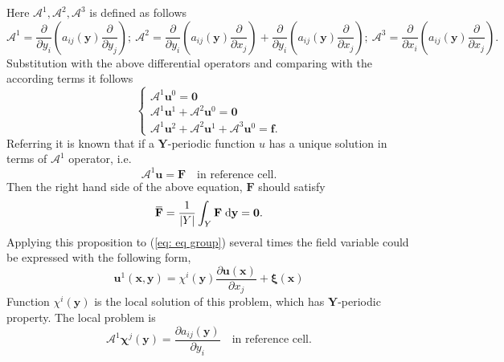 \documentclass[10pt,a4paper]{scrreprt}
\newcommand{\myd}{\;\mathrm{d}}
\newcommand{\overbar}[1]{\mkern 1.5mu\overline{\mkern-1.5mu#1\mkern-1.5mu}\mkern 1.5mu}
\begin{document}
Here $\mathcal{A}^{1}, \mathcal{A}^{2}, \mathcal{A}^{3}$ is defined as follows
\[
\mathcal{A}^{1} = \dfrac{\partial}{\partial y_{i}} \left( a_{ij}(\mathbf{y}) \dfrac{\partial}{\partial y_{j}} \right); \
\mathcal{A}^{2} = \dfrac{\partial}{\partial y_{i}} \left( a_{ij}(\mathbf{y}) \dfrac{\partial}{\partial x_{j}} \right) + \dfrac{\partial}{\partial y_{i}} \left( a_{ij}(\mathbf{y}) \dfrac{\partial}{\partial x_{j}} \right); \
\mathcal{A}^{3} = \dfrac{\partial}{\partial x_{i}} \left( a_{ij}(\mathbf{y}) \dfrac{\partial}{\partial x_{j}} \right).
\]
Substitution with the above differential operators and comparing with the according terms it follows
\begin{equation}
\label{eq: eq group}
\left\{
\begin{array}{l}
\mathcal{A}^{1} \mathbf{u}^{0} = \mathbf{0} \\
\mathcal{A}^{1} \mathbf{u}^{1} + \mathcal{A}^{2} \mathbf{u}^{0} = \mathbf{0} \\
\mathcal{A}^{1} \mathbf{u}^{2} + \mathcal{A}^{2} \mathbf{u}^{1} + \mathcal{A}^{3} \mathbf{u}^{0} = \mathbf{f}.
\end{array}
\right.
\end{equation}
Referring \citep{cioranescu2000introduction} it is known that if a $\mathbf{Y}$-periodic function $u$ has a unique solution in terms of $\mathcal{A}^{1}$ operator, i.e. 
\begin{equation}
\mathcal{A}^{1} \mathbf{u} = \mathbf{F} \quad \text{in reference cell}.
\end{equation}
Then the right hand side of the above equation, $\mathbf{F}$ should satisfy 
\begin{equation}
\overbar{\mathbf{F}} = \dfrac{1}{|Y|}\int_{Y} \mathbf{F} \myd{\mathbf{y}} = \mathbf{0}.
\end{equation}
Applying this proposition to (\ref{eq: eq group}) several times the field variable could be expressed with the following form,
\begin{equation}
\mathbf{u}^{1}(\mathbf{x}, \mathbf{y}) = \chi^{i}(\mathbf{y}) \dfrac{\partial \mathbf{u}(\mathbf{x})}{\partial x_{j}} + \mathbf{\xi} (\mathbf{x})
\end{equation}
Function $\chi^{i}(\mathbf{y})$ is the local solution of this problem, which has $\mathbf{Y}$-periodic property. The local problem is
\begin{equation}
\mathcal{A}^{1} \mathbf{\chi}^{j}(\mathbf{y}) = \dfrac{\partial a_{ij}(\mathbf{y})}{\partial y_{i}} \quad \text{in reference cell}.
\end{equation}
\end{document}
